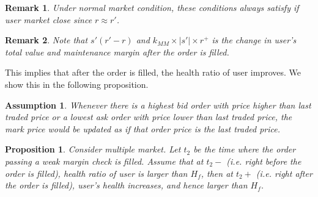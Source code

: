 \documentclass[notitlepage,reqno,11pt]{amsart}
\numberwithin{equation}{section}
\newtheorem{assumption}{Assumption}[section]
\newtheorem{prop}{Proposition}[section]
\newtheorem{remark}{Remark}[section]
\begin{document}
\begin{remark}
    Under normal market condition, these conditions always satisfy if user market close since $r\approx r'$.
\end{remark}

\begin{remark}
    Note that $s'(r'-r)$ and $k_{MM}\times|s'|\times r^+$ is the change in user's total value and maintenance margin after the order is filled.
\end{remark}

This implies that after the order is filled, the health ratio of user improves. We show this in the following proposition.

\begin{assumption}\label{liveness}
    Whenever there is a highest bid order with price higher than last traded price or a lowest ask order with price lower than last traded price, the mark price would be updated as if that order price is the last traded price.
\end{assumption}
\begin{prop}\label{8.1}
    Consider multiple market. Let $t_2$ be the time where the order passing a weak margin check is filled. Assume that at $t_2-$ (i.e. right before the order is filled), health ratio of user is larger than $H_f$, then at $t_2+$ (i.e. right after the order is filled), user's health increases, and hence larger than $H_f$.
\end{prop}
\end{document}
